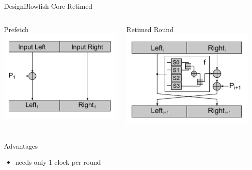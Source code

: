 \begin{frame}{Design}{Blowfish Core Retimed}
	\begin{columns}[T]
		\begin{column}{.45\textwidth}
			\begin{block}{Prefetch}
				\center \includegraphics[width=.90\textwidth]{data/blowfish_prefetch.pdf}
			\end{block}
		\end{column}
		\begin{column}{.45\textwidth}
			\begin{block}{Retimed Round}
				\center \includegraphics[width=.90\textwidth]{data/blowfish_retimed.pdf}
			\end{block}
		\end{column}
	\end{columns}

	\begin{columns}[T]
		\begin{column}{.975\textwidth}
			\begin{exampleblock}{Advantages}
				\begin{itemize}
					\item needs only 1 clock per round
				\end{itemize}
			\end{exampleblock}
		\end{column}
	\end{columns}
\end{frame}


